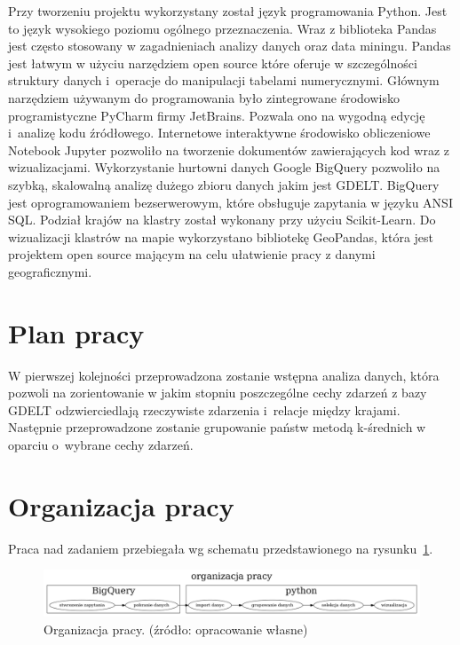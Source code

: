 \documentclass[11pt]{report}
\begin{document}
    Przy tworzeniu projektu wykorzystany został język programowania Python.
    Jest to język wysokiego poziomu ogólnego przeznaczenia.
    Wraz z biblioteka Pandas jest często stosowany w zagadnieniach analizy danych oraz data miningu.
    Pandas jest łatwym w użyciu narzędziem open source które oferuje w szczególności struktury danych i~operacje do manipulacji tabelami numerycznymi.
    Głównym narzędziem używanym do programowania było zintegrowane środowisko programistyczne PyCharm firmy JetBrains.
    Pozwala ono na wygodną edycję i~analizę kodu źródłowego.
    Internetowe interaktywne środowisko obliczeniowe Notebook Jupyter pozwoliło na tworzenie dokumentów zawierających kod wraz z wizualizacjami.
    Wykorzystanie hurtowni danych Google BigQuery pozwoliło na szybką, skalowalną analizę dużego zbioru danych jakim jest GDELT.
    BigQuery jest oprogramowaniem bezserwerowym, które obsługuje zapytania w języku ANSI SQL.
    Podział krajów na klastry został wykonany przy użyciu Scikit-Learn.
    Do wizualizacji klastrów na mapie wykorzystano bibliotekę GeoPandas, która jest projektem open source mającym na celu ułatwienie pracy z danymi geograficznymi.


    \section{Plan pracy}\label{sec:plan-pracy}

    W pierwszej kolejności przeprowadzona zostanie wstępna analiza danych, która pozwoli na zorientowanie w jakim stopniu poszczególne cechy zdarzeń z bazy GDELT odzwierciedlają rzeczywiste zdarzenia i~relacje między krajami.
    Następnie przeprowadzone zostanie grupowanie państw metodą k-średnich w oparciu o~wybrane cechy zdarzeń.


    \section{Organizacja pracy}\label{sec:organizacja-pracy}
    Praca nad zadaniem przebiegała wg schematu przedstawionego na rysunku~\ref{fig:organizacjia}.

    \begin{figure}[!htp]
        \centering
        \includegraphics[width=\linewidth]{fig/organizacja.png}
        \caption{Organizacja pracy. (źródło: opracowanie własne)}
        \label{fig:organizacjia}
    \end{figure}
\end{document}

